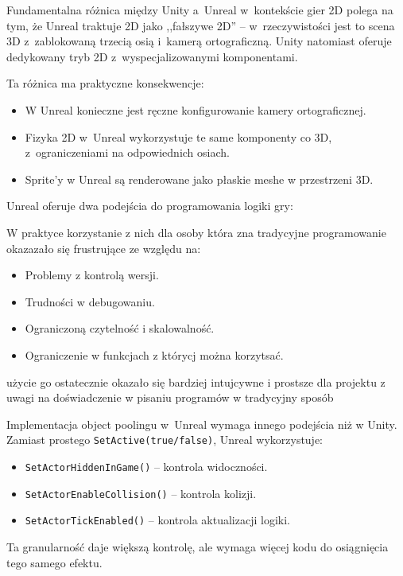 Fundamentalna różnica między Unity a~Unreal w~kontekście gier 2D polega na tym, że Unreal traktuje 2D jako ,,fałszywe 2D'' -- 
w~rzeczywistości jest to scena 3D z~zablokowaną trzecią osią i~kamerą ortograficzną. Unity natomiast oferuje dedykowany 
tryb 2D z~wyspecjalizowanymi komponentami.

Ta różnica ma praktyczne konsekwencje:
\begin{itemize}
    \item W Unreal konieczne jest ręczne konfigurowanie kamery ortograficznej.
    \item Fizyka 2D w~Unreal wykorzystuje te same komponenty co 3D, z~ograniczeniami na odpowiednich osiach.
    \item Sprite'y w Unreal są renderowane jako płaskie meshe w przestrzeni 3D.
\end{itemize}


Unreal oferuje dwa podejścia do programowania logiki gry:


W praktyce korzystanie z nich dla osoby która zna tradycyjne programowanie okazazało się frustrujące ze względu na:
\begin{itemize}
    \item Problemy z kontrolą wersji.
    \item Trudności w debugowaniu.
    \item Ograniczoną czytelność i skalowalność.
    \item Ograniczenie w funkcjach z którycj można korzytsać.
\end{itemize}

użycie go ostatecznie okazało się bardziej intujcywne i prostsze dla projektu z uwagi na doświadczenie w pisaniu programów w 
tradycyjny sposób


Implementacja object poolingu w~Unreal wymaga innego podejścia niż w Unity.
Zamiast prostego \texttt{SetActive(true/\allowbreak false)}, Unreal wykorzystuje:

\begin{itemize}
    \item \texttt{SetActorHiddenInGame()} -- kontrola widoczności.
    \item \texttt{SetActorEnableCollision()} -- kontrola kolizji.
    \item \texttt{SetActorTickEnabled()} -- kontrola aktualizacji logiki.
\end{itemize}

Ta granularność daje większą kontrolę, ale wymaga więcej kodu do osiągnięcia tego samego efektu.


